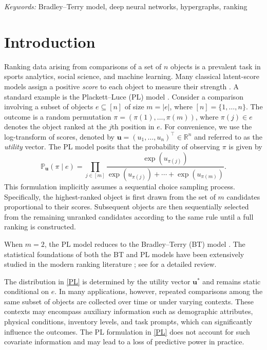 \documentclass[
  12pt]{article}
\begin{document}
\noindent%
{\it Keywords:}  Bradley--Terry model, deep neural networks, hypergraphs, ranking 
\vfill

\newpage
{} %



\section{Introduction}\label{sec:intro}
Ranking data arising from comparisons of a set of $n$ objects is a prevalent task in sports analytics, social science, and machine learning. Many classical latent-score models assign a positive \textit{score} to each object to measure their strength \citep{thurstone1927method, zermelo1929berechnung}. A standard example is the Plackett--Luce (PL) model \citep{luce1959individual, plackett1975analysis}. Consider a comparison involving a subset of objects $e \subseteq [n]$ of size $m=|e|$, where $[n]=\{1,\ldots,n\}$. The outcome is a random permutation $\pi = (\pi(1), \ldots, \pi(m))$, where $\pi(j) \in e$ denotes the object ranked at the $j$th position in $e$. For convenience, we use the log-transform of scores, denoted by $\bm u = (u_1, \ldots, u_n)^\top\in\mathbb R^n$ and referred to as the \textit{utility} vector. The PL model posits that the probability of observing $\pi$ is given by
\begin{equation}
\label{PL}
    \mathbb{P}_{\boldsymbol{u}}\left(\pi \mid e\right)=\prod_{j \in[m]} \frac{\exp (u_{\pi(j)})}{ \exp (u_{\pi(j)})+\cdots + \exp (u_{\pi(m)})}.
\end{equation}
This formulation implicitly assumes a sequential choice sampling process. Specifically, the highest-ranked object is first drawn from the set of 
$m$ candidates proportional to their scores. Subsequent objects are then sequentially selected from the remaining unranked candidates according to the same rule until a full ranking is constructed.



When $m=2$, the PL model reduces to the Bradley--Terry (BT) model \citep{bradley1952rank}. The statistical foundations of both the BT and PL models have been extensively studied in the modern ranking literature \citep{simons1999asymptotics,hunter2004mm, MR2987494,shah2016estimation,Negahban2017rank,chen2019spectral,chen2022partial,gao2023uncertainty,fan2024uncertainty,han2025unifiedanalysis,fan2025spectral}; see \cite{fang2026recent} for a detailed review.

The distribution in \eqref{PL} is determined by the utility vector $\bm u^*$ and remains static conditional on $e$. In many applications, however, repeated comparisons among the same subset of objects are collected over time or under varying contexts.  
These contexts may encompass auxiliary information such as demographic attributes, physical conditions, inventory levels, and task prompts, which can significantly influence the outcomes. The PL formulation in \eqref{PL} does not account for such covariate information and may lead to a loss of predictive power in practice.
\end{document}
